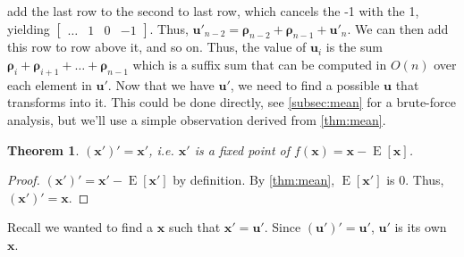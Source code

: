 \documentclass[11pt, oneside]{article}
\DeclareMathOperator{\E}{E}
\renewcommand{\vec}[1]{\bm{#1}}
\theoremstyle{plain}
\newtheorem{theorem}{Theorem}[section]
\theoremstyle{definition}
\begin{document}
add the last row to the second to last row, which cancels the -1 with the
1, yielding \( \begin{bmatrix} \dots & 1 & 0 & -1 \end{bmatrix} \). Thus,
\( \vec{u}'_{n - 2} = \vec{\rho}_{n - 2} + \vec{\rho}_{n - 1} + \vec{u}'_n
\). We can then add this row to row above it, and so on. Thus, the value of
\( \vec{u}_i \) is the sum \( \vec{\rho}_i + \vec{\rho}_{i + 1} + \dots +
\vec{\rho}_{n - 1} \) which is a suffix sum that can be computed in \( O(n)
\) over each element in \( \vec{u}' \). Now that we have \( \vec{u}' \), we
need to find a possible \( \vec{u} \) that transforms into it. This could
be done directly, see \autoref{subsec:mean} for a brute-force analysis, but
we'll use a simple observation derived from \autoref{thm:mean}.

\begin{theorem}
  \( (\vec{x}')' = \vec{x}' \), i.e. \( \vec{x}' \) is a
  fixed point of \( f(\vec{x}) = \vec{x} - \E[\vec{x}] \).
\end{theorem}
\begin{proof}
  \( (\vec{x}')' = \vec{x'} - \E[\vec{x'}] \) by definition.
  By \autoref{thm:mean}, \( \E[\vec{x}'] \) is 0.
  Thus, \( (\vec{x}')' = \vec{x} \).
\end{proof}

Recall we wanted to find a \( \vec{x} \) such that \( \vec{x}' = \vec{u}' \).
Since \( (\vec{u}')' = \vec{u}' \), \( \vec{u}' \) is its own \( \vec{x} \).
\end{document}
